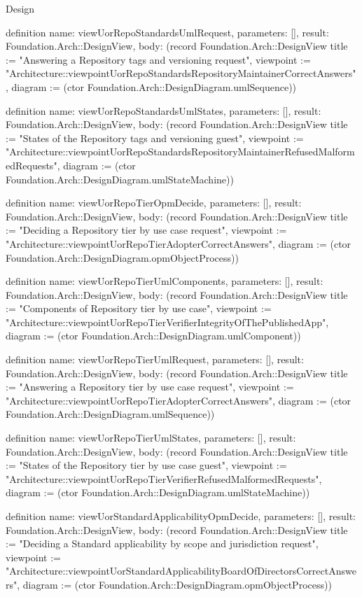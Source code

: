 \begin{lexlean}{Design}
\begin{semanticmodule}
definition{
  name: viewUorRepoStandardsUmlRequest,
  parameters: [],
  result: Foundation.Arch::DesignView,
  body: (record Foundation.Arch::DesignView {title := "Answering a Repository tags and versioning request", viewpoint := "Architecture::viewpointUorRepoStandardsRepositoryMaintainerCorrectAnswers", diagram := (ctor Foundation.Arch::DesignDiagram.umlSequence)})
}

definition{
  name: viewUorRepoStandardsUmlStates,
  parameters: [],
  result: Foundation.Arch::DesignView,
  body: (record Foundation.Arch::DesignView {title := "States of the Repository tags and versioning guest", viewpoint := "Architecture::viewpointUorRepoStandardsRepositoryMaintainerRefusedMalformedRequests", diagram := (ctor Foundation.Arch::DesignDiagram.umlStateMachine)})
}

definition{
  name: viewUorRepoTierOpmDecide,
  parameters: [],
  result: Foundation.Arch::DesignView,
  body: (record Foundation.Arch::DesignView {title := "Deciding a Repository tier by use case request", viewpoint := "Architecture::viewpointUorRepoTierAdopterCorrectAnswers", diagram := (ctor Foundation.Arch::DesignDiagram.opmObjectProcess)})
}

definition{
  name: viewUorRepoTierUmlComponents,
  parameters: [],
  result: Foundation.Arch::DesignView,
  body: (record Foundation.Arch::DesignView {title := "Components of Repository tier by use case", viewpoint := "Architecture::viewpointUorRepoTierVerifierIntegrityOfThePublishedApp", diagram := (ctor Foundation.Arch::DesignDiagram.umlComponent)})
}

definition{
  name: viewUorRepoTierUmlRequest,
  parameters: [],
  result: Foundation.Arch::DesignView,
  body: (record Foundation.Arch::DesignView {title := "Answering a Repository tier by use case request", viewpoint := "Architecture::viewpointUorRepoTierAdopterCorrectAnswers", diagram := (ctor Foundation.Arch::DesignDiagram.umlSequence)})
}

definition{
  name: viewUorRepoTierUmlStates,
  parameters: [],
  result: Foundation.Arch::DesignView,
  body: (record Foundation.Arch::DesignView {title := "States of the Repository tier by use case guest", viewpoint := "Architecture::viewpointUorRepoTierVerifierRefusedMalformedRequests", diagram := (ctor Foundation.Arch::DesignDiagram.umlStateMachine)})
}

definition{
  name: viewUorStandardApplicabilityOpmDecide,
  parameters: [],
  result: Foundation.Arch::DesignView,
  body: (record Foundation.Arch::DesignView {title := "Deciding a Standard applicability by scope and jurisdiction request", viewpoint := "Architecture::viewpointUorStandardApplicabilityBoardOfDirectorsCorrectAnswers", diagram := (ctor Foundation.Arch::DesignDiagram.opmObjectProcess)})
}


\end{semanticmodule}
\end{lexlean}
